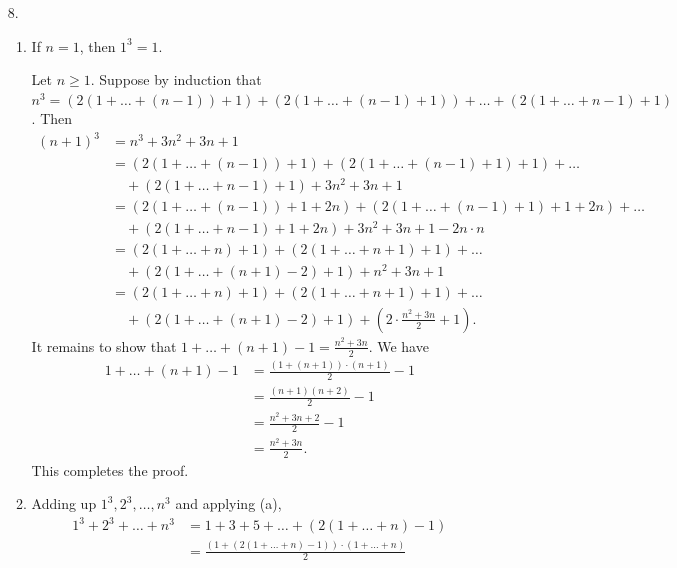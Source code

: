 \documentclass[letterpaper, reqno,11pt]{article}
\begin{document}
\begin{enumerate}
    \item[8.]
    \begin{enumerate}
        \item If $n = 1$, then $1^3 = 1$.
        
        Let $n \geq 1$. Suppose by induction that $n^3 = (2(1 + \ldots + (n - 1)) + 1) + (2(1 + \ldots + (n - 1) + 1)) + \ldots + (2(1 + \ldots + n - 1) + 1)$. Then
        \begin{align*}
            (n + 1)^3 &= n^3 + 3n^2 + 3n + 1 \\
            &= (2(1 + \ldots + (n - 1)) + 1) + (2(1 + \ldots + (n - 1) + 1) + 1) + \ldots \\
            &\quad + (2(1 + \ldots + n - 1) + 1) + 3n^2 + 3n + 1 \\
            &= (2(1 + \ldots + (n - 1)) + 1 + 2n) + (2(1 + \ldots + (n - 1) + 1) + 1 + 2n) + \ldots \\
            &\quad + (2(1 + \ldots + n - 1) + 1 + 2n) + 3n^2 + 3n + 1 - 2n \cdot n \\
            &= (2(1 + \ldots + n) + 1) + (2(1 + \ldots + n + 1) + 1) + \ldots \\
            &\quad + (2(1 + \ldots + (n + 1) - 2) + 1) + n^2 + 3n + 1 \\
            &= (2(1 + \ldots + n) + 1) + (2(1 + \ldots + n + 1) + 1) + \ldots \\
            &\quad + (2(1 + \ldots + (n + 1) - 2) + 1) + \left(2 \cdot \frac{n^2 + 3n}{2} + 1\right).
        \end{align*}
        It remains to show that $1 + \ldots + (n + 1) - 1 = \frac{n^2 + 3n}{2}$. We have
        \begin{align*}
            1 + \ldots + (n + 1) - 1 &= \frac{(1 + (n + 1)) \cdot (n + 1)}{2} - 1 \\
            &= \frac{(n + 1)(n + 2)}{2} - 1 \\
            &= \frac{n^2 + 3n + 2}{2} - 1 \\
            &= \frac{n^2 + 3n}{2}.
        \end{align*}
        This completes the proof.
        \item Adding up $1^3, 2^3, \ldots, n^3$ and applying (a),
        \begin{align*}
            1^3 + 2^3 + \ldots + n^3 &= 1 + 3 + 5 + \ldots + (2(1 + \ldots + n) - 1) \\
            &= \frac{(1 + (2(1 + \ldots + n) - 1)) \cdot (1 + \ldots + n)}{2} \\

\end{align*}
\end{enumerate}
\end{enumerate}
\end{document}

